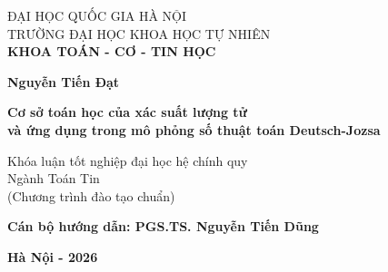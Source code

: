 \begin{titlepage}

    \centering
    {\fontsize{13}{15}\selectfont
      ĐẠI HỌC QUỐC GIA HÀ NỘI\\[2pt]
      TRƯỜNG ĐẠI HỌC KHOA HỌC TỰ NHIÊN\\[2pt]
    }
    {\fontsize{13}{15}\selectfont\bfseries
      KHOA TOÁN - CƠ - TIN HỌC
    }

    \vspace{2.5cm}
    {\fontsize{14}{17}\selectfont\bfseries
      Nguyễn Tiến Đạt
    }

    \vspace{3cm}
    {\fontsize{18}{22}\selectfont\bfseries
      Cơ sở toán học của xác suất lượng tử\\[4pt]
      và ứng dụng trong mô phỏng số thuật toán Deutsch-Jozsa
    }

    \vspace{2.5cm}
    {\fontsize{14}{17}\selectfont
      Khóa luận tốt nghiệp đại học hệ chính quy\\[4pt]
      Ngành Toán Tin\\[4pt]
      (Chương trình đào tạo chuẩn)
    }

    \vspace{1.2cm}
    {\fontsize{14}{17}\selectfont\bfseries
      Cán bộ hướng dẫn: PGS.TS. Nguyễn Tiến Dũng
    }

    \vfill
    {\fontsize{14}{17}\selectfont\bfseries
      Hà Nội - 2026
    }
    \vspace{0.7cm}
\end{titlepage}